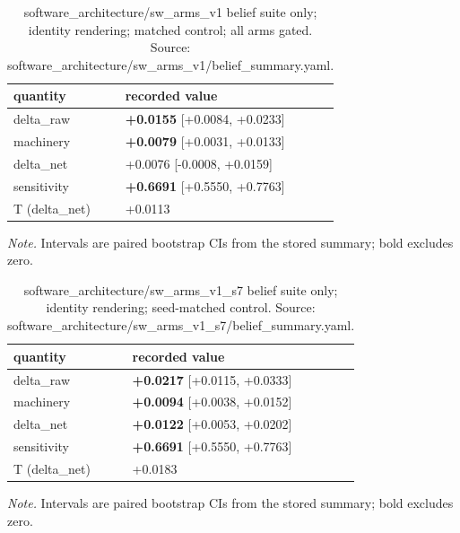 \documentclass[10pt]{article}
\begin{document}
\begin{table}[H]
\centering
\footnotesize
\caption{ software\_architecture/sw\_arms\_v1 belief suite only; identity rendering; matched control; all arms gated. Source: software\_architecture/sw\_arms\_v1/belief\_summary.yaml. }
\label{tab:belief_transfer}



\begin{tabular}{ ll }
\toprule
quantity & recorded value \\
\midrule

delta\_raw & \textbf{+0.0155} [+0.0084, +0.0233] \\

machinery & \textbf{+0.0079} [+0.0031, +0.0133] \\

delta\_net & +0.0076 [-0.0008, +0.0159] \\

sensitivity & \textbf{+0.6691} [+0.5550, +0.7763] \\

T (delta\_net) & +0.0113 \\

\bottomrule
\end{tabular}

\par\footnotesize\emph{Note.} Intervals are paired bootstrap CIs from the stored summary; bold excludes zero.
\end{table}


\begin{table}[H]
\centering
\footnotesize
\caption{ software\_architecture/sw\_arms\_v1\_s7 belief suite only; identity rendering; seed-matched control. Source: software\_architecture/sw\_arms\_v1\_s7/belief\_summary.yaml. }
\label{tab:belief_transfer}



\begin{tabular}{ ll }
\toprule
quantity & recorded value \\
\midrule

delta\_raw & \textbf{+0.0217} [+0.0115, +0.0333] \\

machinery & \textbf{+0.0094} [+0.0038, +0.0152] \\

delta\_net & \textbf{+0.0122} [+0.0053, +0.0202] \\

sensitivity & \textbf{+0.6691} [+0.5550, +0.7763] \\

T (delta\_net) & +0.0183 \\

\bottomrule
\end{tabular}

\par\footnotesize\emph{Note.} Intervals are paired bootstrap CIs from the stored summary; bold excludes zero.
\end{table}
\end{document}

